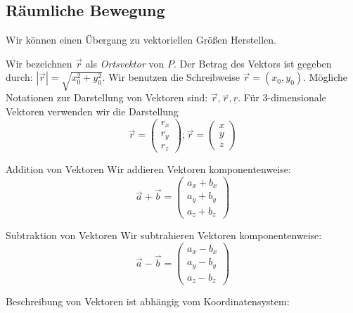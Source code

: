 \documentclass[a4paper,10pt]{scrartcl}
\begin{document}
\subsection{Räumliche Bewegung}
Wir können einen Übergang zu vektoriellen Größen Herstellen.  
\begin{figure}[h]
\end{figure}
Wir bezeichnen $\vec r$ als \emph{Ortsvektor} von $P$.  Der Betrag des Vektors ist gegeben durch: $|\vec r|=\sqrt{x_0^2+y_0^2}$.
Wir benutzen die Schreibweise $\vec r=(x_0,y_0)$.  Mögliche Notationen zur Darstellung von Vektoren sind: $\vec r, \stackrel\rightharpoonup r, \underline{r}$.  Für 3-dimensionale Vektoren verwenden wir die Darstellung \[\vec r=\begin{pmatrix} r_x\\ r_y\\r_z \end{pmatrix}; \vec r= \begin{pmatrix} x\\ y\\z \end{pmatrix}\]
\begin{seg}{Addition von Vektoren}
Wir addieren Vektoren komponentenweise:
\[
\vec a+ \vec b=\begin{pmatrix} a_x+b_x\\ a_y+b_y\\a_z+b_z \end{pmatrix}
\]
\begin{figure}[h]
\end{figure}
\end{seg}
\begin{seg}{Subtraktion von Vektoren}
Wir subtrahieren Vektoren komponentenweise:
\[
\vec a- \vec b=\begin{pmatrix} a_x-b_x\\ a_y-b_y\\a_z-b_z \end{pmatrix}
\]
\begin{figure}[h]
\end{figure}
Beschreibung von Vektoren ist abhängig vom Koordinatensystem:
\end{seg}
\end{document}
